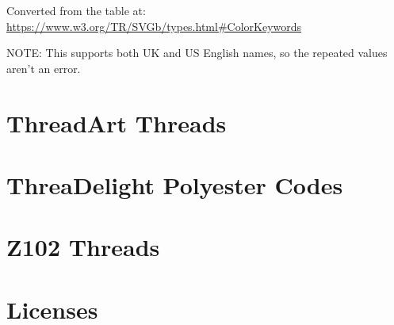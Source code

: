 \documentclass[a4paper]{report}
\begin{document}
Converted from the table at:
\url{https://www.w3.org/TR/SVGb/types.html#ColorKeywords}

NOTE: This supports both UK and US English names, so the repeated values aren't
an error.

\section{ThreadArt Threads}

% 

% 

\section{ThreaDelight Polyester Codes}

\section{Z102 Threads}



\section{Licenses}



\printindex
\end{document}
